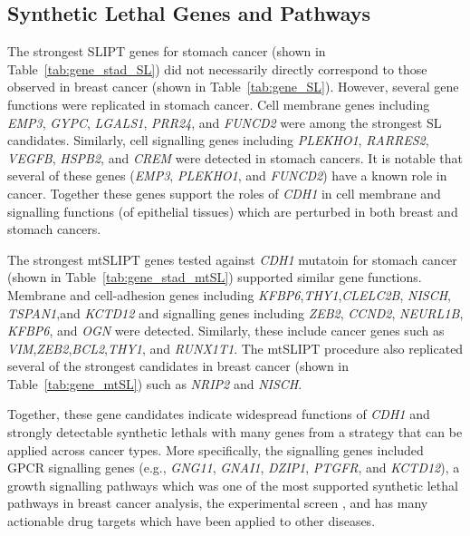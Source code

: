 \iffalse
\subsection{Synthetic Lethal Genes and Pathways} \label{chapt3:stad_SL_genes}

The strongest \gls{SLIPT} genes for stomach cancer (shown in Table~\ref{tab:gene_stad_SL}) did not necessarily directly correspond to those observed in breast cancer (shown in Table~\ref{tab:gene_SL}). However, several gene functions were replicated in stomach cancer. Cell membrane genes including \textit{EMP3}, \textit{GYPC},  \textit{LGALS1}, \textit{PRR24},  and \textit{FUNCD2} were among the strongest SL candidates. Similarly, cell signalling genes including \textit{PLEKHO1}, \textit{RARRES2}, \textit{VEGFB}, \textit{HSPB2}, and \textit{CREM} were detected in stomach cancers. It is notable that several of these genes (\textit{EMP3}, \textit{PLEKHO1}, and \textit{FUNCD2}) have a known role in cancer. Together these genes support the roles of \textit{CDH1} in cell membrane and signalling functions (of epithelial tissues) which are perturbed in both breast and stomach cancers.

The strongest \acrshort{mtSLIPT} genes tested against \textit{CDH1} mutatoin for stomach cancer (shown in Table~\ref{tab:gene_stad_mtSL}) supported similar gene functions. Membrane and cell-adhesion genes including \textit{KFBP6},\textit{THY1},\textit{CLELC2B}, \textit{NISCH}, \textit{TSPAN1},and \textit{KCTD12} and signalling genes including \textit{ZEB2}, \textit{CCND2}, \textit{NEURL1B}, \textit{KFBP6}, and \textit{OGN} were detected. Similarly, these include cancer genes such as \textit{VIM},\textit{ZEB2},\textit{BCL2},\textit{THY1}, and \textit{RUNX1T1}. The \acrshort{mtSLIPT} procedure also replicated several of the strongest candidates in breast cancer (shown in Table~\ref{tab:gene_mtSL}) such as \textit{NRIP2} and \textit{NISCH}.

Together, these gene candidates indicate widespread functions of \textit{CDH1} and strongly detectable \glspl{synthetic lethal} with many genes from a strategy that can be applied across cancer types. More specifically, the signalling genes included \gls{GPCR} signalling genes (e.g., \textit{GNG11}, \textit{GNAI1}, \textit{DZIP1}, \textit{PTGFR}, and \textit{KCTD12}), a growth signalling \glspl{pathway} which was one of the most supported \gls{synthetic lethal} \glspl{pathway} in breast cancer analysis, the experimental screen \citep{Telford2015}, and has many actionable drug targets which have been applied to other diseases.

